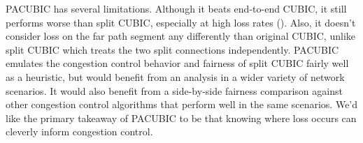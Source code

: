 PACUBIC has several limitations. Although it beats end-to-end CUBIC, it still
performs worse than split CUBIC, especially at high loss rates
(). Also, it doesn't consider loss on the far
path segment any differently than original CUBIC, unlike split CUBIC which
treats the two split connections independently. PACUBIC emulates the congestion
control behavior and fairness of split CUBIC fairly well as a heuristic, but
would benefit from an analysis in a wider variety of network scenarios. It
would also benefit from a side-by-side fairness comparison against other
congestion control algorithms that perform well in the same scenarios. We'd
like the primary takeaway of PACUBIC to be that knowing where loss occurs can
cleverly inform congestion control.
